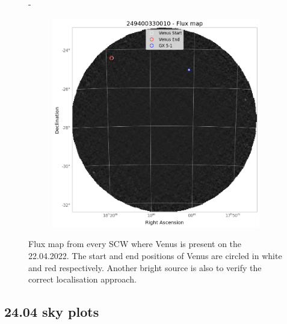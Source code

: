 \documentclass[
	a4paper, %
	10pt, %
	unnumberedsections, %
	twoside, %
]{LTJournalArticle}
\begin{document}
\begin{figure}[H]
\begin{subfigure}{.3\textwidth}
        \end{subfigure}
        \hspace{1em}-
        \begin{subfigure}{.3\textwidth}
            \centering
            \includegraphics[width=\textwidth]{report/Figures/methods/2204/33_map.png}
        \end{subfigure}
        \caption{Flux map from every SCW where Venus is present on the 22.04.2022. The start and end positions of Venus are circled in white and red respectively. Another bright source is also to verify the correct localisation approach.}
        \label{22_flux_map}
        \end{figure}

\subsection{24.04 sky plots}
\end{document}
